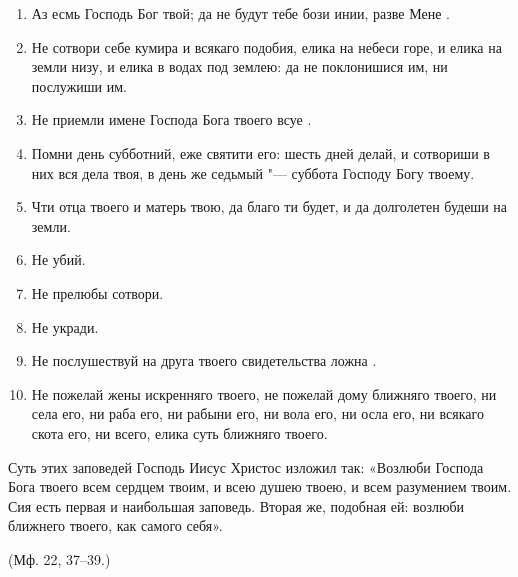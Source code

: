 \begin{mymulticols}
 
\begin{enumerate}

\item Аз есмь Господь Бог твой; да не будут тебе бози инии, разве Мене .

\item Не сотвори себе кумира и всякаго подобия, елика на небеси горе, и елика на земли низу, и елика  в водах под землею: да не поклонишися им, ни послужиши им.

\item Не приемли  имене Господа Бога твоего всуе .

\item Помни день субботний, еже святити его: шесть дней делай, и сотвориши в них вся дела твоя, в день же седьмый "--- суббота Господу Богу твоему.

\item Чти отца твоего и матерь твою, да благо ти будет, и да долголетен будеши на земли.

\item Не убий.

\item Не прелюбы сотвори.

\item Не укради.

\item Не послушествуй на друга твоего свидетельства ложна .

\item Не пожелай жены искренняго твоего, не пожелай дому ближняго твоего, ни села его, ни раба его, ни рабыни его, ни вола его, ни осла его, ни всякаго скота его, ни всего, елика суть ближняго твоего.

\end{enumerate}


Суть этих заповедей Господь Иисус Христос изложил так: «Возлюби Господа Бога твоего всем сердцем твоим, и всею душею твоею, и всем разумением твоим. Сия есть первая и наибольшая заповедь. Вторая же, подобная ей: возлюби ближнего твоего, как самого себя».

(Мф. 22, 37--39.) 

\end{mymulticols}

